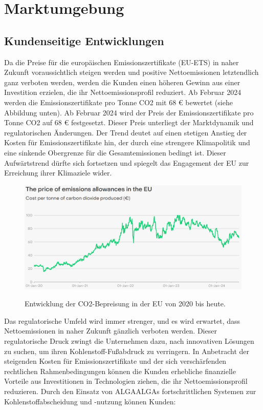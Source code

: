 \chapter{Marktumgebung}

\section{Kundenseitige Entwicklungen}

Da die Preise für die europäischen Emissionszertifikate (EU-ETS) in naher Zukunft voraussichtlich steigen werden und positive Nettoemissionen letztendlich ganz verboten werden, werden die Kunden einen höheren Gewinn aus einer Investition erzielen, die ihr Nettoemissionsprofil reduziert.
Ab Februar 2024 werden die Emissionszertifikate pro Tonne CO2 mit 68 € bewertet (siehe Abbildung unten).
Ab Februar 2024 wird der Preis der Emissionszertifikate pro Tonne CO2 auf 68 € festgesetzt.
Dieser Preis unterliegt der Marktdynamik und regulatorischen Änderungen.
Der Trend deutet auf einen stetigen Anstieg der Kosten für Emissionszertifikate hin, der durch eine strengere Klimapolitik und eine sinkende Obergrenze für die Gesamtemissionen bedingt ist.
Dieser Aufwärtstrend dürfte sich fortsetzen und spiegelt das Engagement der EU zur Erreichung ihrer Klimaziele wider.

\begin{figure}[h]
    \centering
    \includegraphics[width=.9\textwidth]{Carbon Price Tracker_Ember.png}
    \label{fig:carbon price tracker}
    \caption[Entwicklung der CO2-Bepreisung in der EU]{Entwicklung der CO2-Bepreisung in der EU von 2020 bis heute.}
\end{figure}

Das regulatorische Umfeld wird immer strenger, und es wird erwartet, dass Nettoemissionen in naher Zukunft gänzlich verboten werden.
Dieser regulatorische Druck zwingt die Unternehmen dazu, nach innovativen Lösungen zu suchen, um ihren Kohlenstoff-Fußabdruck zu verringern.
In Anbetracht der steigenden Kosten für Emissionszertifikate und der sich verschärfenden rechtlichen Rahmenbedingungen können die Kunden erhebliche finanzielle Vorteile aus Investitionen in Technologien ziehen, die ihr Nettoemissionsprofil reduzieren.
Durch den Einsatz von ALGAALGAs fortschrittlichen Systemen zur Kohlenstoffabscheidung und -nutzung können Kunden:

